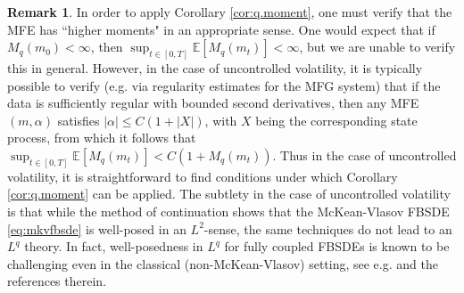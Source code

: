 \documentclass[11pt,reqno]{amsart}
\numberwithin{equation}{section}
\newtheorem{corollary}[theorem]{Corollary}
\theoremstyle{definition}
\newtheorem{remark}[theorem]{Remark}
\def\E{{\mathbb E}}
\def\R{{\mathbb R}}
\def\N{{\mathbb N}}
\def \E{\mathbb{E}}
\def \N{\mathbb{N}}
\def \R{\mathbb{R}}
\begin{document}
\begin{remark}
In order to apply Corollary \eqref{cor:q.moment}, one must verify that the MFE has ``higher moments" in an appropriate sense. One would expect that if $M_q(m_0) < \infty$, then $\sup_{t \in [0,T]} \E[M_q(m_t)] < \infty$, but we are unable to verify this in general. However, in the case of uncontrolled volatility, it is typically possible to verify (e.g. via regularity estimates for the MFG system) that if the data is sufficiently regular with bounded second derivatives, then any MFE $(m,\alpha)$ satisfies $|\alpha| \leq C(1 + |X|)$, with $X$ being the corresponding state process, from which it follows that $\sup_{t \in [0,T]} \E[M_q(m_t)] < C(1 + M_q(m_t))$. Thus in the case of uncontrolled volatility, it is straightforward to find conditions under which Corollary \ref{cor:q.moment} can be applied. The subtlety in the case of uncontrolled volatility is that while the method of continuation shows that the McKean-Vlasov FBSDE \eqref{eq:mkvfbsde} is well-posed in an $L^2$-sense, the same techniques do not lead to an $L^q$ theory. In fact, well-posedness in $L^q$ for fully coupled FBSDEs is known to be challenging even in the classical (non-McKean-Vlasov) setting, see e.g. \cite{XIE2020123642} and the references therein.
\end{remark}

\end{document}
